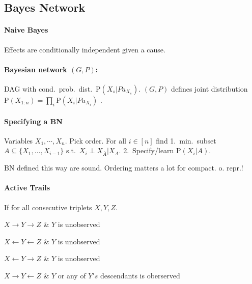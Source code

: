 \documentclass[a4paper, 10pt]{scrartcl}
\newcommand{\abs}[1]{\left\lvert #1 \right\rvert}
\newcommand{\Prob}[2][]{P_{#1}\left( #2 \right)}
\newcommand{\Exp}[2][]{{\mathbb{E}_{#1}}\left[ #2
\right]}
\newcommand{\uP}{\mathrm P}
\begin{document}
	\begin{multicols*}{3}
	\begin{comment}
\paragraph{Hoeffding's Inequality}
Suppose $f$ is bounded in $[0,C]$. Then
\begin{align*}
\Prob{
\underbrace{\abs{
\underbrace{\Exp[P]{f(X)}}_{\text{true exp.}}
-
\underbrace{\frac{1}{N}\sum_{i=1}^Nf(x_i)}_{\text{approx.; emp. avg.}}
}}_{\text{abs. error}}
>\varepsilon
}
\leq
\underbrace{
2e^{\frac{-2N\varepsilon^2}{C^2}}
}_{=:\delta(C,\varepsilon, N)}
=
2\left(e^{-2\left(\frac{\varepsilon}{C}\right)^2}\right)^N.
\end{align*}

\[
N > \frac{1}{2}\left(\frac{C}{\varepsilon}\right)^2
\log\left(\frac{2}{\delta}\right)
\]
\end{comment}


		\section{Bayes Network}
		\paragraph{Naive Bayes} Effects are conditionally independent given a cause.
		
		\paragraph{Bayesian network $(G,P)$:} DAG with cond.\ prob.\ dist.\ $\uP(X_s| Pa_{X_{s}})$.
		 $(G,P)$ defines joint distribution $\uP (X_{1:n}) = \prod_{i} \uP(X_i| Pa_{X_{i}})$  .

		\paragraph{Specifying a BN}
		Variables $X_1, \cdots, X_n$. Pick order. For all $i \in [n]$ find 1.\ min.\ subset $A \subseteq \{X_1,\dots,X_{i-1}\}$ s.t.\ $X_i \perp X_{\bar A}|X_A$.
		2.\ Specify/learn $\uP(X_i|A)$.

		BN defined this way are sound. Ordering matters a lot for compact. o. repr.!
		
		\paragraph{Active Trails} If for all consecutive triplets $X, Y, Z$.
		\begin{compactitem}
			\item  $X \rightarrow  Y \rightarrow Z$ \& $Y$ is unobserved
			\item  $X \leftarrow  Y \leftarrow Z$ \& $Y$ is unobserved
			\item  $X \leftarrow  Y \rightarrow Z$ \& $Y$ is unobserved
			\item  $X \rightarrow  Y \leftarrow Z$ \& $Y$ or any of $Y's$ descendants is oberserved
		\end{compactitem}
	

\end{multicols*}
\end{document}
